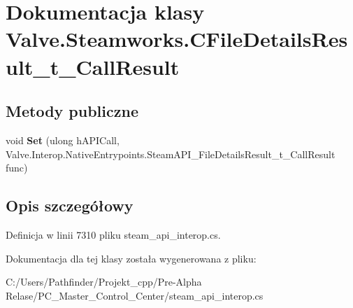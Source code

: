 \hypertarget{class_valve_1_1_steamworks_1_1_c_file_details_result__t___call_result}{}\section{Dokumentacja klasy Valve.\+Steamworks.\+C\+File\+Details\+Result\+\_\+t\+\_\+\+Call\+Result}
\label{class_valve_1_1_steamworks_1_1_c_file_details_result__t___call_result}
\subsection*{Metody publiczne}
\begin{DoxyCompactItemize}
\item 
\mbox{\label{class_valve_1_1_steamworks_1_1_c_file_details_result__t___call_result_a650760b10a6ff0916e103ec66ca331ea}} 
void {\bfseries Set} (ulong h\+A\+P\+I\+Call, Valve.\+Interop.\+Native\+Entrypoints.\+Steam\+A\+P\+I\+\_\+\+File\+Details\+Result\+\_\+t\+\_\+\+Call\+Result func)
\end{DoxyCompactItemize}


\subsection{Opis szczegółowy}


Definicja w linii 7310 pliku steam\+\_\+api\+\_\+interop.\+cs.



Dokumentacja dla tej klasy została wygenerowana z pliku\+:\begin{DoxyCompactItemize}
\item 
C\+:/\+Users/\+Pathfinder/\+Projekt\+\_\+cpp/\+Pre-\/\+Alpha Relase/\+P\+C\+\_\+\+Master\+\_\+\+Control\+\_\+\+Center/steam\+\_\+api\+\_\+interop.\+cs\end{DoxyCompactItemize}
